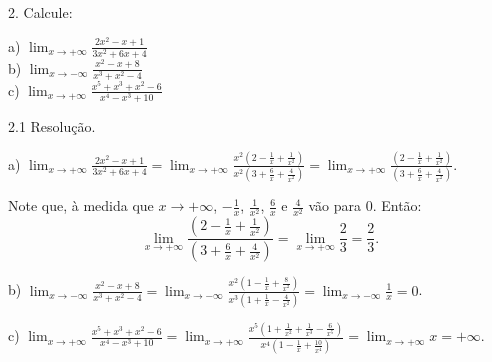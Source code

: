 \documentclass{article}
\begin{document}
{\begin{newpage}
\vspace{0.3cm}
\begin{flushleft}
2. Calcule:
\end{flushleft}
\par
\begin{multicols}{3}
a) $\displaystyle{\lim_{x\to +\infty }} \frac{2x^2 - x + 1}{3x^2 + 6x + 4}$\\
b) $\displaystyle{\lim_{x\to -\infty }} \frac{x^2 - x + 8}{x^3 + x^2 - 4}$\\
c) $\displaystyle{\lim_{x\to +\infty }} \frac{x^5 + x^3 + x^2 - 6}{x^4 - x^3 + 10}$
\end{multicols}
\par
\vspace{0.3cm}
\begin{flushleft}
2.1 Resolução.
\end{flushleft}
\par
a) $\displaystyle{\lim_{x\to +\infty } \frac{2x^2 - x + 1}{3x^2 + 6x + 4} = \lim_{x\to +\infty } \frac{x^2(2 - \frac{1}{x} + \frac{1}{x^2})}{x^2(3 + \frac{6}{x} + \frac{4}{x^2})} = \lim_{x\to +\infty } \frac{(2 - \frac{1}{x} + \frac{1}{x^2})}{(3 + \frac{6}{x} + \frac{4}{x^2})}}$.
\vspace{0.2cm}
\par Note que, à medida que $x\rightarrow +\infty$, $\displaystyle{-\frac{1}{x}}$, $\displaystyle{\frac{1}{x^2}}$, $\displaystyle{\frac{6}{x}}$ e $\displaystyle{\frac{4}{x^2}}$ vão para 0. Então:
$$\displaystyle{\lim_{x\to +\infty } \frac{(2 - \frac{1}{x} + \frac{1}{x^2})}{(3 + \frac{6}{x} + \frac{4}{x^2})} = \lim_{x\to +\infty } \frac{2}{3} = \frac{2}{3}}.$$
\par
\vspace{0.3cm}
b) $\displaystyle{\lim_{x\to -\infty } \frac{x^2 - x + 8}{x^3 + x^2 - 4} = \lim_{x\to -\infty } \frac{x^2(1 - \frac{1}{x} + \frac{8}{x^2})}{x^3(1 + \frac{1}{x} - \frac{4}{x^2})} = \lim_{x\to  -\infty } \frac{1}{x} = 0}$.
\par
\vspace{0.3cm}
c) $\displaystyle{\lim_{x\to +\infty } \frac{x^5 + x^3 + x^2 - 6}{x^4 - x^3 + 10} = \lim_{x\to +\infty } \frac{x^5(1 + \frac{1}{x^2} + \frac{1}{x^3} - \frac{6}{x^5})}{x^4(1 - \frac{1}{x} + \frac{10}{x^4})} = \lim_{x\to +\infty } x  = +\infty }$.
\par
\vspace{0.3cm}

\end{newpage}}
\end{document}
